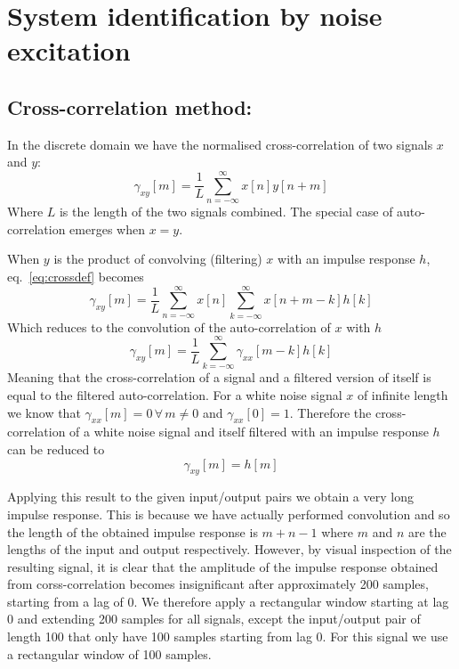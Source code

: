 \section{System identification by noise excitation}
\subsection{Cross-correlation method:}
In the discrete domain we have the normalised cross-correlation of two signals \(x\) and \(y\):
\begin{equation}
	\gamma_{xy}[m] = \frac{1}{L}\sum_{n=-\infty}^{\infty} x[n]y[n+m]
	\label{eq:crossdef}
\end{equation}
Where \(L\) is the length of the two signals combined. The special case of auto-correlation emerges when \(x=y\). 

When \(y\) is the product of convolving (filtering) \(x\) with an impulse response \(h\), eq.~\ref{eq:crossdef} becomes
\begin{equation*}
	\gamma_{xy}[m] = \frac{1}{L}\sum_{n=-\infty}^{\infty}x[n]\sum_{k=-\infty}^\infty x[n+m-k]h[k]
\end{equation*}
Which reduces to the convolution of the auto-correlation of \(x\) with \(h\)
\begin{equation*}
	\gamma_{xy}[m] = \frac{1}{L}\sum_{k=-\infty}^\infty \gamma_{xx}[m-k]h[k]
\end{equation*}
Meaning that the cross-correlation of a signal and a filtered version of itself is equal to the filtered auto-correlation. 
For a white noise signal \(x\) of infinite length we know that \(\gamma_{xx}[m]=0\, \forall\, m\neq 0\) and \(\gamma_{xx}[0]=1\).
Therefore the cross-correlation of a white noise signal and itself filtered with an impulse response \(h\) can be reduced to
\begin{equation*}
	\gamma_{xy}[m] = h[m]
\end{equation*}

Applying this result to the given input/output pairs we obtain a very long impulse response. This is because we have actually 
performed convolution and so the length
of the obtained impulse response is \(m+n-1\) where \(m\) and \(n\) are the lengths of the input and output respectively.
However, by visual inspection of the resulting signal, it is clear that the amplitude of the impulse response obtained from
corss-correlation becomes 
insignificant after approximately 200 samples, starting from a lag of 0. We therefore apply a rectangular window starting at
lag 0 and extending 200 samples for all signals, except the input/output pair of length 100 that only have 100 samples starting
from lag 0. For this signal we use a rectangular window of 100 samples.

